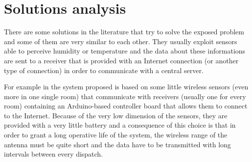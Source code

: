 \section{Solutions analysis}
\label{sec:solutions_analysis}

There are some solutions in the literature that try to solve the exposed problem and some of them are very similar to each other.
They usually exploit sensors able to perceive humidity or temperature and the data about these informations are sent to a receiver that is provided with an Internet connection (or another type of connection) in order to communicate with a central server.

For example in \cite{7969984} the system proposed is based on some little wireless sensors (even more in one single room) that communicate with receivers (usually one for every room) containing an Arduino-based controller board that allows them to connect to the Internet.
Because of the very low dimension of the sensors, they are provided with a very little battery and a consequence of this choice is that in order to grant a long operative life of the system, the wireless range of the antenna must be quite short and the data have to be transmitted with long intervals between every dispatch.
